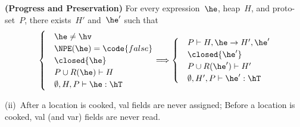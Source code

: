 \documentclass[10pt,a4paper]{article}
\begin{document}
\begin{Theorem}[preservation]
  \textbf{(Progress and Preservation)}
    For every expression~$\he$, heap~$H$, and proto-set~$P$,
        there exists~$H'$ and~$\he'$
        such that
        \[
        \begin{cases}
        & \he \neq \hv\\
        & \NPE(\he)=\code{false}\\
        & \closed{\he}\\
        & P \cup R(\he) \vdash H\\
        & \emptyset,H,P \vdash \he : \hT\\
        \end{cases}
        \Longrightarrow
        \begin{cases}
        & P \vdash H,\he \rightarrow H',\he'\\
        &\closed{\he'}\\
        &P \cup R(\he') \vdash H'\\
        &\emptyset,H',P \vdash \he':\hT\\
        \end{cases}
        \]
\end{Theorem}


(ii)~After a location is cooked, val fields are never assigned;
    Before a location is cooked, val (and var) fields are never read.
\end{document}
